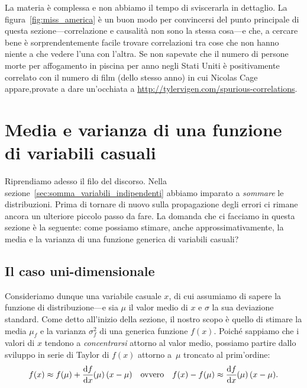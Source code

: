 La materia è complessa e non abbiamo il tempo di sviscerarla in dettaglio.
La figura~\ref{fig:miss_america} è un buon modo per convincersi del punto
principale di questa sezione---correlazione e causalità non sono la stessa
cosa---e che, a cercare bene è sorprendentemente facile trovare
correlazioni tra cose che non hanno niente a che vedere l'una con l'altra.
Se non sapevate che il numero di persone morte per affogamento in piscina per
anno negli Stati Uniti è positivamente correlato con il numero di film
(dello stesso anno) in cui Nicolas Cage appare,provate a dare un'occhiata a
\url{http://tylervigen.com/spurious-correlations}.


\section{Media e varianza di una funzione di variabili casuali}
\label{sec:media_var_funzioni}

Riprendiamo adesso il filo del discorso. Nella sezione~\ref{sec:somma_variabili_indipendenti}
abbiamo imparato a \emph{sommare} le distribuzioni. Prima di tornare di nuovo
sulla propagazione degli errori ci rimane ancora un ulteriore piccolo passo da
fare. La domanda che ci facciamo in questa sezione è la seguente: come possiamo
stimare, anche approssimativamente, la media e la varianza di una funzione generica
di variabili casuali?


\subsection{Il caso uni-dimensionale}

Consideriamo dunque una variabile casuale $x$, di cui assumiamo di sapere la
funzione di distribuzione---e sia $\mu$ il valor medio di $x$ e $\sigma$ la
sua deviazione standard. Come detto all'inizio della sezione, il nostro scopo
è quello di stimare la media $\mu_f$ e la varianza $\sigma^2_f$ di una
generica funzione $f(x)$.
Poiché sappiamo che i valori di $x$ tendono a \emph{concentrarsi} attorno al
valor medio, possiamo partire dallo sviluppo in serie di Taylor di $f(x)$
attorno a~$\mu$ troncato al prim'ordine:
\begin{align*}
  f(x) \approx f(\mu) + \td{f}{x}{\mu}(x - \mu)
  \quad \text{ovvero} \quad
  f(x) - f(\mu) \approx \td{f}{x}{\mu}(x - \mu).
\end{align*}

